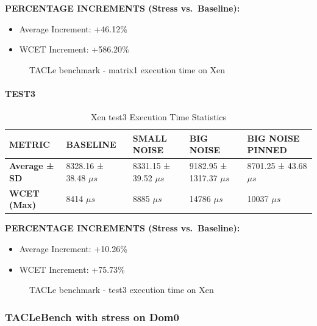 \textbf{PERCENTAGE INCREMENTS (Stress vs.~Baseline):}

\begin{itemize}
\item
  Average Increment: +46.12\%
\item
  WCET Increment: +586.20\%
\end{itemize}

\begin{figure}
\centering

\caption{TACLe benchmark - matrix1 execution time on Xen}
\end{figure}

\paragraph{TEST3}\label{test3-1}

\begin{table}
\centering
\caption{Xen test3 Execution Time Statistics}
\begin{tabularx}{\linewidth}{@{}YYYYY@{}}
\toprule
METRIC & BASELINE & SMALL NOISE & BIG NOISE & BIG NOISE PINNED\tabularnewline
\midrule
\textbf{Average ± SD} & 8328.16 ± 38.48 $\mu s$ & 8331.15 ± 39.52 $\mu s$ & 9182.95 ± 1317.37 $\mu s$ & 8701.25 ± 43.68 $\mu s$\tabularnewline
\textbf{WCET (Max)} & 8414 $\mu s$ & 8885 $\mu s$ & 14786 $\mu s$ & 10037 $\mu s$\tabularnewline
\bottomrule
\end{tabularx}
\end{table}

\textbf{PERCENTAGE INCREMENTS (Stress vs.~Baseline):}

\begin{itemize}
\item
  Average Increment: +10.26\%
\item
  WCET Increment: +75.73\%
\end{itemize}

\begin{figure}
\centering

\caption{TACLe benchmark - test3 execution time on Xen}
\end{figure}

\subsubsection{TACLeBench with stress on
Dom0}\label{taclebench-with-stress-on-dom0}

